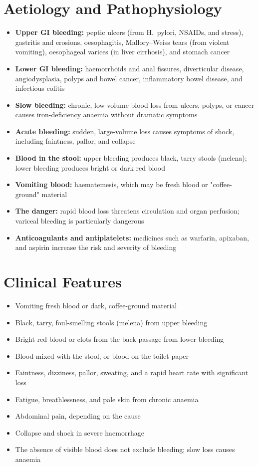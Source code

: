 \section*{Aetiology and Pathophysiology}
\begin{itemize}
    \item \textbf{Upper GI bleeding:} peptic ulcers (from H.\ pylori, NSAIDs, and stress), gastritis and erosions, oesophagitis, Mallory--Weiss tears (from violent vomiting), oesophageal varices (in liver cirrhosis), and stomach cancer
    \item \textbf{Lower GI bleeding:} haemorrhoids and anal fissures, diverticular disease, angiodysplasia, polyps and bowel cancer, inflammatory bowel disease, and infectious colitis
    \item \textbf{Slow bleeding:} chronic, low-volume blood loss from ulcers, polyps, or cancer causes iron-deficiency anaemia without dramatic symptoms
    \item \textbf{Acute bleeding:} sudden, large-volume loss causes symptoms of shock, including faintness, pallor, and collapse
    \item \textbf{Blood in the stool:} upper bleeding produces black, tarry stools (melena); lower bleeding produces bright or dark red blood
    \item \textbf{Vomiting blood:} haematemesis, which may be fresh blood or "coffee-ground" material
    \item \textbf{The danger:} rapid blood loss threatens circulation and organ perfusion; variceal bleeding is particularly dangerous
    \item \textbf{Anticoagulants and antiplatelets:} medicines such as warfarin, apixaban, and aspirin increase the risk and severity of bleeding
\end{itemize}

\section*{Clinical Features}
\begin{itemize}
    \item Vomiting fresh blood or dark, coffee-ground material
    \item Black, tarry, foul-smelling stools (melena) from upper bleeding
    \item Bright red blood or clots from the back passage from lower bleeding
    \item Blood mixed with the stool, or blood on the toilet paper
    \item Faintness, dizziness, pallor, sweating, and a rapid heart rate with significant loss
    \item Fatigue, breathlessness, and pale skin from chronic anaemia
    \item Abdominal pain, depending on the cause
    \item Collapse and shock in severe haemorrhage
    \item The absence of visible blood does not exclude bleeding; slow loss causes anaemia
\end{itemize}

